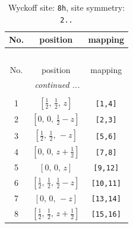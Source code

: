 \documentclass[fleqn,8pt]{jsarticle}
\begin{document}
\begin{longtable}{ccc}
\caption{Wyckoff site: {\tt 8h}, site symmetry: {\tt 2..}}
 \\
 \hline \hline
No. & position & mapping \\ \hline \endfirsthead

\multicolumn{2}{l}{\tablename\ \thetable{}} \\
 \hline \hline
No. & position & mapping \\ \hline \endhead

 \hline \hline
\multicolumn{2}{r}{\footnotesize\it continued ...} \\ \endfoot

 \hline \hline
\multicolumn{2}{r}{} \\ \endlastfoot

1 & $\left[ \frac{1}{2},\, \frac{1}{2},\, z \right]$ & {\tt [1,4]} \\ \hline
2 & $\left[ 0,\, 0,\, \frac{1}{2} - z \right]$ & {\tt [2,3]} \\ \hline
3 & $\left[ \frac{1}{2},\, \frac{1}{2},\, - z \right]$ & {\tt [5,6]} \\ \hline
4 & $\left[ 0,\, 0,\, z + \frac{1}{2} \right]$ & {\tt [7,8]} \\ \hline
5 & $\left[ 0,\, 0,\, z \right]$ & {\tt [9,12]} \\ \hline
6 & $\left[ \frac{1}{2},\, \frac{1}{2},\, \frac{1}{2} - z \right]$ & {\tt [10,11]} \\ \hline
7 & $\left[ 0,\, 0,\, - z \right]$ & {\tt [13,14]} \\ \hline
8 & $\left[ \frac{1}{2},\, \frac{1}{2},\, z + \frac{1}{2} \right]$ & {\tt [15,16]} \\
\end{longtable}
\renewcommand{\arraystretch}{1.2}
\end{document}
